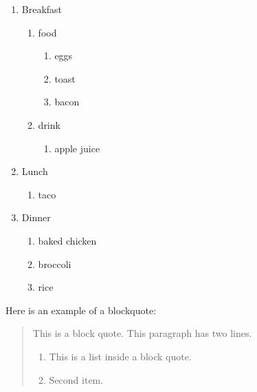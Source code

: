 \documentclass[
]{article}
\providecommand{\tightlist}{%
  \setlength{\itemsep}{0pt}\setlength{\parskip}{0pt}}
\begin{document}
\begin{enumerate}
\def\labelenumi{\arabic{enumi}.}
\tightlist
\item
  Breakfast

  \begin{enumerate}
  \def\labelenumii{\alph{enumii}.}
  \tightlist
  \item
    food

    \begin{enumerate}
    \def\labelenumiii{\roman{enumiii}.}
    \tightlist
    \item
      eggs
    \item
      toast
    \item
      bacon
    \end{enumerate}
  \item
    drink

    \begin{enumerate}
    \def\labelenumiii{\roman{enumiii}.}
    \tightlist
    \item
      apple juice
    \end{enumerate}
  \end{enumerate}
\item
  Lunch

  \begin{enumerate}
  \def\labelenumii{\alph{enumii}.}
  \tightlist
  \item
    taco
  \end{enumerate}
\item
  Dinner

  \begin{enumerate}
  \def\labelenumii{\alph{enumii}.}
  \tightlist
  \item
    baked chicken
  \item
    broccoli
  \item
    rice
  \end{enumerate}
\end{enumerate}

Here is an example of a blockquote:

\begin{quote}
This is a block quote. This paragraph has two lines.

\begin{enumerate}
\def\labelenumi{\arabic{enumi}.}
\tightlist
\item
  This is a list inside a block quote.
\item
  Second item.
\end{enumerate}
\end{quote}
\end{document}
